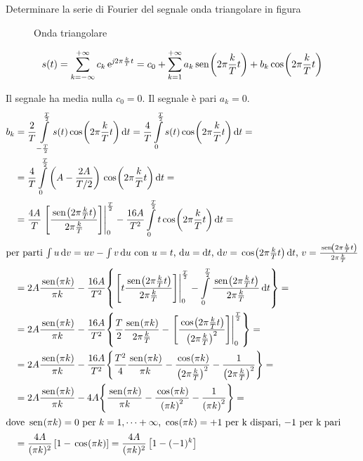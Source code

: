 \begin{esercizio}
Determinare la serie di Fourier del segnale onda triangolare in figura
\begin{figure}[!ht]
\begin{center}
\end{center}
\caption{Onda triangolare}\label{fig:onda_triangolare}
\end{figure}

\[s(t)=\sum_{k=-\infty}^{+\infty}{c_k \operatorname{e}^{\operatorname{\mathit{j}\!} 2\pi\frac{k}{T}t}} =c_0+\sum_{k=1}^{+\infty}{a_k\,{\operatorname{sen}}^{}\!\left({2\pi\frac{k}{T}t}\right)+b_k\,{\operatorname{cos}}^{}\!\left({2\pi\frac{k}{T}t}\right)}\]

Il segnale ha media nulla $c_0=0$. Il segnale è pari $a_k=0$.
\begin{align*}
b_k&=\frac{2}{T}\intd{-\frac{T}{2}}{\frac{T}{2}}{s(t)\cos{2\pi\frac{k}{T}t}}{t}=\frac{4}{T}\intd{0}{\frac{T}{2}}{s(t)\cos{2\pi\frac{k}{T}t}}{t}=\\
&=\frac{4}{T}\intd{0}{\frac{T}{2}}{\left(A-\frac{2 A}{T/2}\right)\cos{2\pi\frac{k}{T}t}}{t}=\\
&=\frac{4A}{T}\bound{0}{\frac{T}{2}}{\frac{\sen{2\pi\frac{k}{T}t}}{2\pi\frac{k}{T}}} -\frac{16A}{T^2}\intd{0}{\frac{T}{2}}{t\cos{2\pi\frac{k}{T}t}}{t}=\\
\intertext{per parti $\int u\diff v= u v-\int v\diff u$ con $u=t$, $\diff u=\diff t$, $\diff v=\cos{2\pi\frac{k}{T}t}\diff t$, $v=\frac{\sen{2\pi\frac{k}{T}t}}{2\pi\frac{k}{T}}$}
&=2A \frac{\sen{\pi k}}{\pi k}-\frac{16A}{T^2}{\left\lbrace \bound{0}{\frac{T}{2}}{t\frac{\sen{2\pi\frac{k}{T}t}}{2\pi\frac{k}{T}}}-\intd{0}{\frac{T}{2}}{\frac{\sen{2\pi\frac{k}{T}t}}{2\pi\frac{k}{T}}}{t}\right\rbrace}=\\
&=2A \frac{\sen{\pi k}}{\pi k}-\frac{16A}{T^2}{\left\lbrace\frac{T}{2}\frac{\sen{\pi k}}{2\pi\frac{k}{T}}-\bound{0}{\frac{T}{2}}{\frac{\cos{2\pi\frac{k}{T}t}}{\left(2\pi\frac{k}{T}\right)^2}}\right\rbrace}=\\
&=2A \frac{\sen{\pi k}}{\pi k}-\frac{16A}{T^2}{\left\lbrace\frac{T^2}{4}\frac{\sen{\pi k}}{\pi k}-\frac{\cos{\pi k}}{\left(2\pi\frac{k}{T}\right)^2}-\frac{1}{\left(2\pi\frac{k}{T}\right)^2}\right\rbrace}=\\
&=2A \frac{\sen{\pi k}}{\pi k}-4A{\left\lbrace\frac{\sen{\pi k}}{\pi k}-\frac{\cos{\pi k}}{\left(\pi k\right)^2}-\frac{1}{\left(\pi k\right)^2}\right\rbrace}=\\
\intertext{dove $\sen{\pi k}=0$ per $k=1,\dots+\infty$, $\cos{\pi k}=+1$ per k dispari, $-1$ per k pari}
&=\frac{4A}{(\pi k)^2}\left[1-\cos{\pi k}\right] = \frac{4A}{(\pi k)^2}\left[1-(-1)^k\right]
\end{align*}
\end{esercizio}

